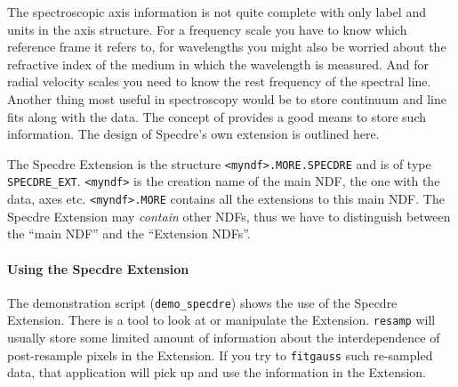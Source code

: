    The spectroscopic axis information is not quite complete with only
   label and units in the axis structure. For a frequency scale you have
   to know which reference frame it refers to, for wavelengths you might
   also be worried about the refractive index of the medium in which the
   wavelength is measured. And for radial velocity scales you need to
   know the rest frequency of the spectral line. Another thing most
   useful in spectroscopy would be to store continuum and line fits
   along with the data. The concept of
   provides a
   good means to store such information. The design of Specdre's own
   extension is outlined here.

   The Specdre Extension is the structure {\tt <myndf>.MORE.SPECDRE} and
   is of type {\tt SPECDRE\_EXT}. {\tt <myndf>} is the creation name of
   the main NDF, the one with the data, axes etc. {\tt <myndf>.MORE}
   contains all the extensions to this main NDF. The Specdre Extension
   may {\it contain} other NDFs, thus we have to distinguish between the
   ``main NDF'' and the ``Extension NDFs''.


\paragraph{\label{specdreextens}Using the Specdre Extension}

   The demonstration script (\texttt{demo\_specdre}) shows the use of the 
   Specdre Extension.  There is a tool
{\tt{}} to look at or manipulate the
   Extension. {\tt resamp} will usually store some limited amount of
   information about the interdependence of post-resample pixels in the
   Extension. If you try to {\tt fitgauss} such re-sampled data, that
   application will pick up and use the information in the Extension.

